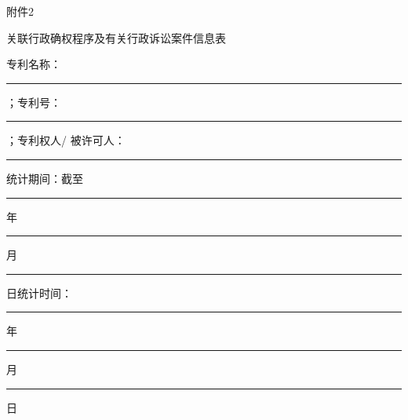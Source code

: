 \documentclass[a4paper,12pt,twoside]{ctexart}
\begin{document}
\newpage
\begin{center}
    {\fzdbs\fontsize{18bp}{18bp}\selectfont 附件2}\par
    \vspace{5bp}
    {\fzdbs\fontsize{14bp}{14bp}\selectfont 关联行政确权程序及有关行政诉讼案件信息表}\par
\end{center}
\vspace{5bp}
\noindent\fontsize{9bp}{12bp}\selectfont 专利名称：\rule{80bp}{0.5pt}；专利号：\rule{80bp}{0.5pt}；专利权人/ 被许可人：\rule{80bp}{0.5pt}\par
\noindent\fontsize{9bp}{12bp}\selectfont 统计期间：截至\rule{20bp}{0.5pt}年\rule{15bp}{0.5pt}月\rule{15bp}{0.5pt}日\hspace{2em}统计时间：\rule{20bp}{0.5pt}年\rule{15bp}{0.5pt}月\rule{15bp}{0.5pt}日\par
\vspace{5bp}
\end{document}
